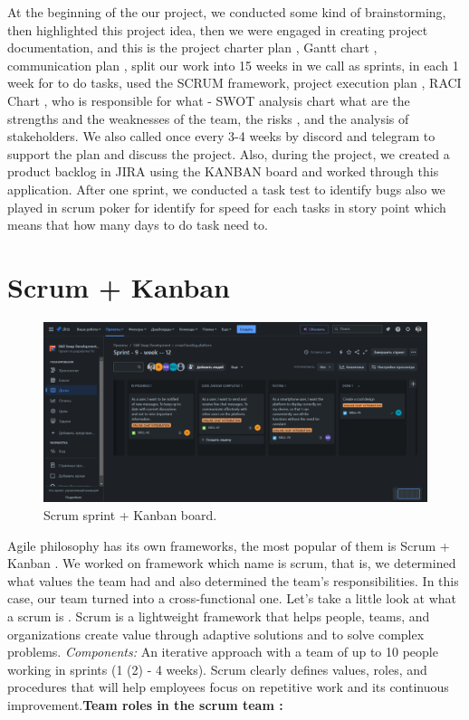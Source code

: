 At the beginning of the our project, we conducted some kind of brainstorming, then highlighted this project idea, then we were engaged in creating project documentation, and this is the project charter plan \cite{projectcharter}, Gantt chart \cite{gantChart}, communication plan \cite{communicationplant}, split our work into 15 weeks in we call as sprints, in each 1 week for to do tasks, used the SCRUM \cite{scrumguide} framework, project execution plan \cite{executionplan}, RACI Chart \cite{racichart}, who is responsible for what - SWOT analysis chart \cite{swotanalyse} what are the strengths and the weaknesses of the team, the risks \cite{risksanalyse}, and the analysis of stakeholders. We also called once every 3-4 weeks by discord \cite{discord} and telegram \cite{telegram} to support the plan and discuss the project. Also, during the project, we created a product backlog in JIRA using the KANBAN board \cite{jira} and worked through this application. After one sprint, we conducted a task test to identify bugs also we played in scrum poker for identify for speed for each tasks in story point which means that how many days to do task need to.

\section{Scrum + Kanban}\label{scrmkan}
\begin{figure}[ht]\label{fig:kanbanboard}
  \centering
  \includegraphics[width=0.8\linewidth]{figures/Kanban board.png}
  \caption{Scrum sprint + Kanban board.}
\end{figure}

\hspace*{1cm} Agile philosophy \cite{agile} has its own frameworks, the most popular of them is Scrum + Kanban \cite{jira}. We worked on framework which name is scrum, that is, we determined what values the team had and also determined the team's responsibilities. In this case, our team turned into a cross-functional one. Let's take a little look at what a scrum is \cite{scrumguide}. Scrum is a lightweight framework that helps people, teams, and organizations create value through adaptive solutions and to solve complex problems. \textit{Components:} An iterative approach with a team of up to 10 people working in sprints (1 (2) - 4 weeks). Scrum clearly defines values, roles, and procedures that will help employees focus on repetitive work and its continuous improvement.\textbf{Team roles in the scrum team \cite{scrumguide}:}

